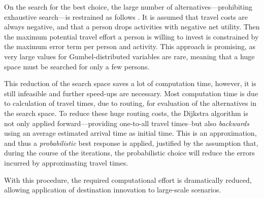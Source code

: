 On the search for the best choice, the large number of alternatives---prohibiting exhaustive search---is restrained as follows \citet[for the detailed derivation see][p.51 ff.]{Horni_PhDThesis_2013}. It is assumed that travel costs are always negative, and that a person drops activities with negative net utility. Then the maximum potential travel effort a person is willing to invest is constrained by the maximum error term per person and activity. This approach is promising, as very large values for Gumbel-distributed {\orange variables} are rare, meaning that a huge space must be searched for only a few persons. 

This reduction of the search space saves a lot of computation time, however, it is still infeasible and further speed-ups are necessary. Most computation time is due to calculation of travel times, \ie due to routing, for evaluation of the alternatives in the search space. To reduce these huge routing costs, the Dijkstra algorithm is not only applied forward---providing one-to-all travel times--but also \emph{backwards} using an average estimated arrival time as initial time. This is an approximation, and thus a \emph{probabilistic} best response is applied, justified by the 
assumption that, during the course of the iterations, the probabilistic choice 
will reduce
the errors incurred by approximating travel times. 

With this procedure, the required computational effort is dramatically reduced, allowing application of destination innovation to large-scale scenarios.

